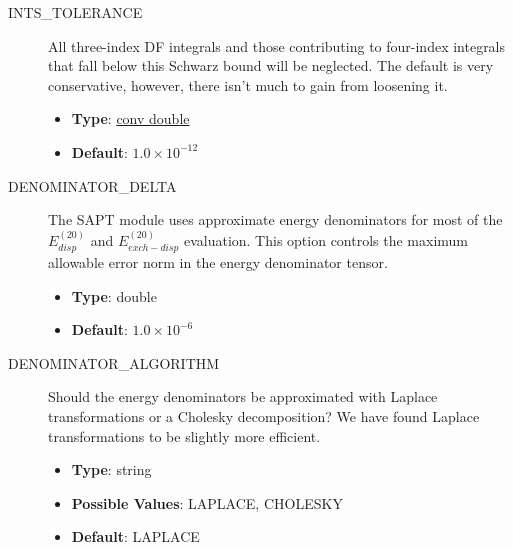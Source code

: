\documentclass[letterpaper,10pt,english]{sphinxmanual}
\begin{document}
\begin{description}
\item[{INTS\_TOLERANCE}] \leavevmode{}\label{index:term-ints-tolerance}
All three-index DF integrals and those contributing to four-index
integrals that fall below this Schwarz bound will be neglected.
The default is very conservative, however, there isn't much to
gain from loosening it.
\begin{itemize}
\item {} 
\textbf{Type}: {\hyperref[index:conv-double]{conv double}}

\item {} 
\textbf{Default}: $1.0 \times 10^{-12}$

\end{itemize}

\end{description}
\begin{description}
\item[{DENOMINATOR\_DELTA}] \leavevmode{}\label{index:term-denominator-delta}
The SAPT module uses approximate energy denominators for most of the
$E_{disp}^{(20)}$ and $E_{exch-disp}^{(20)}$ evaluation.
This option controls the maximum allowable error norm in the energy
denominator tensor.
\begin{itemize}
\item {} 
\textbf{Type}: double

\item {} 
\textbf{Default}: $1.0 \times 10^{-6}$

\end{itemize}

\end{description}
\begin{description}
\item[{DENOMINATOR\_ALGORITHM}] \leavevmode{}\label{index:term-denominator-algorithm}
Should the energy denominators be approximated with Laplace
transformations or a Cholesky decomposition? We have found
Laplace transformations to be slightly more efficient.
\begin{itemize}
\item {} 
\textbf{Type}: string

\item {} 
\textbf{Possible Values}: LAPLACE, CHOLESKY

\item {} 
\textbf{Default}: LAPLACE

\end{itemize}

\end{description}
\end{document}
